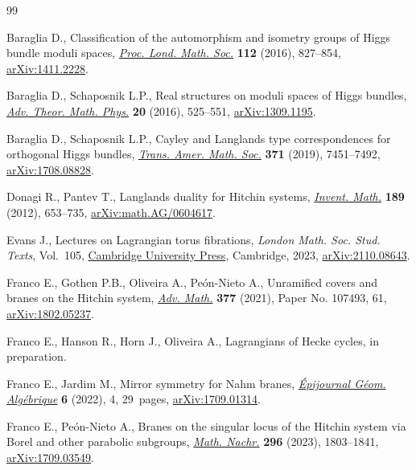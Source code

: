 \begin{thebibliography}{99}
\footnotesize\itemsep=0pt

Baraglia D., Classification of the automorphism and isometry groups of {H}iggs
 bundle moduli spaces,
 \href{https://doi.org/10.1112/plms/pdw014}{\textit{Proc. Lond. Math. Soc.}}
 \textbf{112} (2016), 827--854,
 \href{http://arxiv.org/abs/1411.2228}{arXiv:1411.2228}.

Baraglia D., Schaposnik L.P., Real structures on moduli spaces of {H}iggs
 bundles, \href{https://doi.org/10.4310/ATMP.2016.v20.n3.a2}{\textit{Adv.
 Theor. Math. Phys.}} \textbf{20} (2016), 525--551,
 \href{http://arxiv.org/abs/1309.1195}{arXiv:1309.1195}.

Baraglia D., Schaposnik L.P., Cayley and {L}anglands type correspondences for
 orthogonal {H}iggs bundles,
 \href{https://doi.org/10.1090/tran/7587}{\textit{Trans. Amer. Math. Soc.}}
 \textbf{371} (2019), 7451--7492,
 \href{http://arxiv.org/abs/1708.08828}{arXiv:1708.08828}.

Donagi R., Pantev T., Langlands duality for {H}itchin systems,
 \href{https://doi.org/10.1007/s00222-012-0373-8}{\textit{Invent. Math.}}
 \textbf{189} (2012), 653--735,
 \href{http://arxiv.org/abs/math.AG/0604617}{arXiv:math.AG/0604617}.

Evans J., Lectures on {L}agrangian torus fibrations, \textit{London Math. Soc.
 Stud. Texts}, Vol.~105,
 \href{https://doi.org/10.1017/9781009372671}{Cambridge University Press},
 Cambridge, 2023, \href{http://arxiv.org/abs/2110.08643}{arXiv:2110.08643}.

Franco E., Gothen P.B., Oliveira A., Pe\'{o}n-Nieto A., Unramified covers and
 branes on the {H}itchin system,
 \href{https://doi.org/10.1016/j.aim.2020.107493}{\textit{Adv. Math.}}
 \textbf{377} (2021), Paper No. 107493, 61,
 \href{http://arxiv.org/abs/1802.05237}{arXiv:1802.05237}.

Franco E., Hanson R., Horn J., Oliveira A., Lagrangians of Hecke cycles, {i}n
 preparation.

Franco E., Jardim M., Mirror symmetry for {N}ahm branes,
 \href{https://doi.org/10.46298/epiga.2022.6604}{\textit{\'{E}pijournal
 G\'{e}om. Alg\'{e}brique}} \textbf{6} (2022), 4, 29~pages,
 \href{http://arxiv.org/abs/1709.01314}{arXiv:1709.01314}.

Franco E., Pe\'{o}n-Nieto A., Branes on the singular locus of the {H}itchin
 system via {B}orel and other parabolic subgroups,
 \href{https://doi.org/10.1002/mana.202000267}{\textit{Math. Nachr.}}
 \textbf{296} (2023), 1803--1841,
 \href{http://arxiv.org/abs/1709.03549}{arXiv:1709.03549}.


\end{thebibliography}
